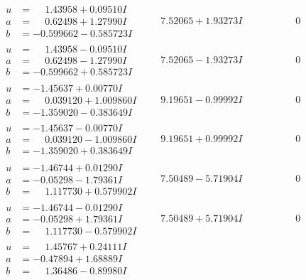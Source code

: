 \documentclass[1p]{elsarticle_modified}
\theoremstyle{definition}
\begin{document}
$$\begin{array}{c|c|c}
\begin{aligned}
u &= \phantom{-}1.43958 + 0.09510 I \\
a &= \phantom{-}0.62498 + 1.27990 I \\
b &= -0.599662 - 0.585723 I\end{aligned}
 & \phantom{-}7.52065 + 1.93273 I & \phantom{-0.000000 } 0 \\ \hline\begin{aligned}
u &= \phantom{-}1.43958 - 0.09510 I \\
a &= \phantom{-}0.62498 - 1.27990 I \\
b &= -0.599662 + 0.585723 I\end{aligned}
 & \phantom{-}7.52065 - 1.93273 I & \phantom{-0.000000 } 0 \\ \hline\begin{aligned}
u &= -1.45637 + 0.00770 I \\
a &= \phantom{-}0.039120 + 1.009860 I \\
b &= -1.359020 - 0.383649 I\end{aligned}
 & \phantom{-}9.19651 - 0.99992 I & \phantom{-0.000000 } 0 \\ \hline\begin{aligned}
u &= -1.45637 - 0.00770 I \\
a &= \phantom{-}0.039120 - 1.009860 I \\
b &= -1.359020 + 0.383649 I\end{aligned}
 & \phantom{-}9.19651 + 0.99992 I & \phantom{-0.000000 } 0 \\ \hline\begin{aligned}
u &= -1.46744 + 0.01290 I \\
a &= -0.05298 - 1.79361 I \\
b &= \phantom{-}1.117730 + 0.579902 I\end{aligned}
 & \phantom{-}7.50489 - 5.71904 I & \phantom{-0.000000 } 0 \\ \hline\begin{aligned}
u &= -1.46744 - 0.01290 I \\
a &= -0.05298 + 1.79361 I \\
b &= \phantom{-}1.117730 - 0.579902 I\end{aligned}
 & \phantom{-}7.50489 + 5.71904 I & \phantom{-0.000000 } 0 \\ \hline\begin{aligned}
u &= \phantom{-}1.45767 + 0.24111 I \\
a &= -0.47894 + 1.68889 I \\
b &= \phantom{-}1.36486 - 0.89980 I\end{aligned}

\end{array}$$
\end{document}
